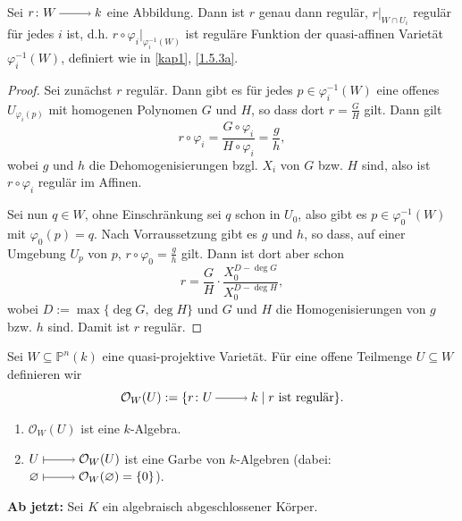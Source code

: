 \documentclass[a4paper,12pt]{scrbook}
\theoremstyle{keinenummern} %
\theoremstyle{mitnummern}
\theoremstyle{unserbeweis}
\newtheorem{proof}{Beweis}
\def\O{\mathcal{O}}
\def\P{\mathbb{P}}
\newcommand{\leer}{\ensuremath{\varnothing}}
\newcommand{\restrict}[1]{|_{#1}}
\newcommand{\ra}{\raisebox{-1pt}{\tikz{\draw[thin,shorten >=3pt, ->] (0,0) node{\hspace*{-2pt}} -- node{} (1,0);}}\penalty1000\relax}
\renewcommand{\mapsto}{\raisebox{-1pt}{\tikz{\draw[thin,shorten >=3pt, |->] (0,0) node{\hspace*{0pt}} -- node{} (1,0);}}\penalty1000\relax}
\begin{document}
\begin{bem}\label{2.5.2}
Sei $r\colon W\ra k$ eine Abbildung. Dann ist $r$ genau dann regulär, $r\restrict{W\cap U_{i}}$ regulär für jedes $i$ ist, d.h. $r\circ\varphi_{i}\restrict{\varphi_{i}^{-1}(W)}$ ist reguläre Funktion der quasi-affinen Varietät $\varphi_{i}^{-1}(W)$, definiert wie in \cref{kap1}, \cref{1.5.3a}.
\end{bem}
\begin{proof} Sei zunächst $r$ regulär. Dann gibt es für jedes $p\in\varphi_{i}^{-1}(W)$ eine offenes $U_{\varphi_{i}(p)}$ mit homogenen Polynomen $G$ und $H$, so dass dort $r=\frac{G}{H}$ gilt. Dann gilt
\[r\circ\varphi_{i}=\frac{G\circ\varphi_{i}}{H\circ\varphi_{i}}=\frac{g}{h},\]
wobei $g$ und $h$ die Dehomogenisierungen bzgl. $X_{i}$ von $G$ bzw. $H$ sind, also ist $r\circ\varphi_{i}$ regulär im Affinen.

Sei nun $q\in W$, ohne Einschränkung sei $q$ schon in $U_{0}$, also gibt es $p\in\varphi_{0}^{-1}(W)$ mit $\varphi_{0}(p)=q$. Nach Vorraussetzung gibt es $g$ und $h$, so dass, auf einer Umgebung $U_{p}$ von $p$, $r\circ\varphi_{0}=\frac{g}{h}$ gilt. Dann ist dort aber schon
\[r=\frac{G}{H}\cdot\frac{X_{0}^{D-\deg G}}{X_{0}^{D-\deg H}},\]
wobei $D:=\max\{\deg G,\deg H\}$ und $G$ und $H$ die Homogenisierungen von $g$ bzw. $h$ sind. Damit ist $r$ regulär.
\end{proof}

\begin{db}\label{2.5.3}
Sei $W\subseteq\P^{n}(k)$ eine quasi-projektive Varietät. Für eine offene Teilmenge $U\subseteq W$ definieren wir 
\[\O_{W}(U):=\{r\colon U\ra k\mid r\text{ ist regulär}\}.\]
\begin{enumerate}
\item $\O_{W}(U)$ ist eine $k$-Algebra.
\item $U\mapsto\O_{W}(U)$ ist eine Garbe von $k$-Algebren (dabei: $\leer\mapsto\O_{W}(\leer)=\{0\}$).
\end{enumerate}\end{db}

\begin{w}
{\bf Ab jetzt:} Sei $K$ ein algebraisch abgeschlossener Körper.
\end{w}
\end{document}
